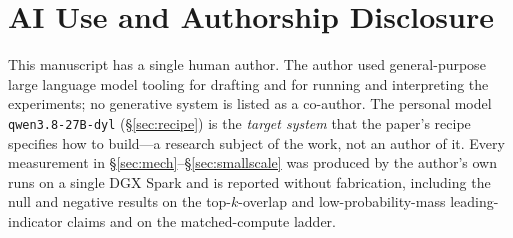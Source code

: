 \documentclass[11pt]{article}
\begin{document}
\section*{AI Use and Authorship Disclosure}
This manuscript has a single human author. The author used general-purpose
large language model tooling for drafting and for running and interpreting
the experiments; no generative system is listed as a co-author. The personal
model \texttt{qwen3.8-27B-dyl} (\S\ref{sec:recipe}) is the \emph{target
system} that the paper's recipe specifies how to build---a research subject
of the work, not an author of it. Every measurement in
\S\ref{sec:mech}--\S\ref{sec:smallscale} was produced by the author's own
runs on a single DGX Spark and is reported without fabrication, including the
null and negative results on the top-$k$-overlap and low-probability-mass
leading-indicator claims and on the matched-compute ladder.
\end{document}
